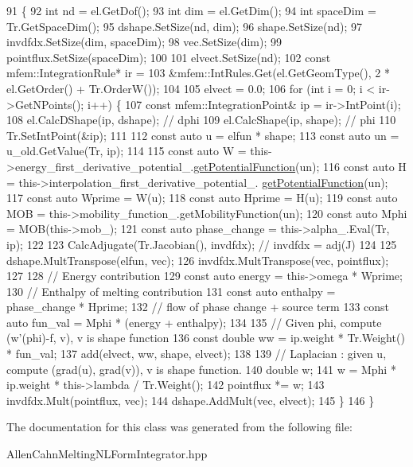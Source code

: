 \begin{DoxyCode}
91                         \{
92   \textcolor{keywordtype}{int} nd = el.GetDof();
93   \textcolor{keywordtype}{int} dim = el.GetDim();
94   \textcolor{keywordtype}{int} spaceDim = Tr.GetSpaceDim();
95   dshape.SetSize(nd, dim);
96   shape.SetSize(nd);
97   invdfdx.SetSize(dim, spaceDim);
98   vec.SetSize(dim);
99   pointflux.SetSize(spaceDim);
100 
101   elvect.SetSize(nd);
102   \textcolor{keyword}{const} mfem::IntegrationRule* ir =
103       &mfem::IntRules.Get(el.GetGeomType(), 2 * el.GetOrder() + Tr.OrderW());
104 
105   elvect = 0.0;
106   \textcolor{keywordflow}{for} (\textcolor{keywordtype}{int} i = 0; i < ir->GetNPoints(); i++) \{
107     \textcolor{keyword}{const} mfem::IntegrationPoint& ip = ir->IntPoint(i);
108     el.CalcDShape(ip, dshape);  \textcolor{comment}{// dphi}
109     el.CalcShape(ip, shape);    \textcolor{comment}{// phi}
110     Tr.SetIntPoint(&ip);
111 
112     \textcolor{keyword}{const} \textcolor{keyword}{auto} u = elfun * shape;
113     \textcolor{keyword}{const} \textcolor{keyword}{auto} un = u\_old.GetValue(Tr, ip);
114 
115     \textcolor{keyword}{const} \textcolor{keyword}{auto} W = this->energy\_first\_derivative\_potential\_.\hyperlink{classPotentialFunctions_af7b46074a256a70b110ae621d0335874}{getPotentialFunction}(un);
116     \textcolor{keyword}{const} \textcolor{keyword}{auto} H = this->interpolation\_first\_derivative\_potential\_.
      \hyperlink{classPotentialFunctions_af7b46074a256a70b110ae621d0335874}{getPotentialFunction}(un);
117     \textcolor{keyword}{const} \textcolor{keyword}{auto} Wprime = W(u);
118     \textcolor{keyword}{const} \textcolor{keyword}{auto} Hprime = H(u);
119     \textcolor{keyword}{const} \textcolor{keyword}{auto} MOB = this->mobility\_function\_.getMobilityFunction(un);
120     \textcolor{keyword}{const} \textcolor{keyword}{auto} Mphi = MOB(this->mob\_);
121     \textcolor{keyword}{const} \textcolor{keyword}{auto} phase\_change = this->alpha\_.Eval(Tr, ip);
122 
123     CalcAdjugate(Tr.Jacobian(), invdfdx);  \textcolor{comment}{// invdfdx = adj(J)}
124 
125     dshape.MultTranspose(elfun, vec);
126     invdfdx.MultTranspose(vec, pointflux);
127 
128     \textcolor{comment}{// Energy contribution}
129     \textcolor{keyword}{const} \textcolor{keyword}{auto} energy = this->omega * Wprime;
130     \textcolor{comment}{// Enthalpy of melting contribution}
131     \textcolor{keyword}{const} \textcolor{keyword}{auto} enthalpy = phase\_change * Hprime;
132     \textcolor{comment}{// flow of phase change + source term}
133     \textcolor{keyword}{const} \textcolor{keyword}{auto} fun\_val = Mphi * (energy + enthalpy);
134 
135     \textcolor{comment}{// Given phi, compute (w'(phi)-f, v), v is shape function}
136     \textcolor{keyword}{const} \textcolor{keywordtype}{double} ww = ip.weight * Tr.Weight() * fun\_val;
137     add(elvect, ww, shape, elvect);
138 
139     \textcolor{comment}{// Laplacian : given u, compute (grad(u), grad(v)), v is shape function.}
140     \textcolor{keywordtype}{double} w;
141     w = Mphi * ip.weight * this->lambda / Tr.Weight();
142     pointflux *= w;
143     invdfdx.Mult(pointflux, vec);
144     dshape.AddMult(vec, elvect);
145   \}
146 \}
\end{DoxyCode}


The documentation for this class was generated from the following file\+:\begin{DoxyCompactItemize}
\item 
Allen\+Cahn\+Melting\+N\+L\+Form\+Integrator.\+hpp\end{DoxyCompactItemize}
